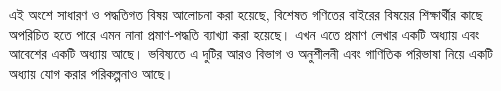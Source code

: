 \documentclass[../../include/open-logic-part]{subfiles}
\begin{document}

\begin{editorial}
  এই অংশে সাধারণ ও পদ্ধতিগত বিষয় আলোচনা করা হয়েছে, বিশেষত
  গণিতের বাইরের বিষয়ের শিক্ষার্থীর কাছে অপরিচিত হতে পারে এমন
  নানা প্রমাণ-পদ্ধতি ব্যাখ্যা করা হয়েছে। এখন এতে প্রমাণ লেখার
  একটি অধ্যায় এবং আবেশের একটি অধ্যায় আছে। ভবিষ্যতে এ দুটির
  আরও বিভাগ ও অনুশীলনী এবং গাণিতিক পরিভাষা নিয়ে একটি অধ্যায়
  যোগ করার পরিকল্পনাও আছে।
\end{editorial}



\OLEndPartHook
\end{document}
